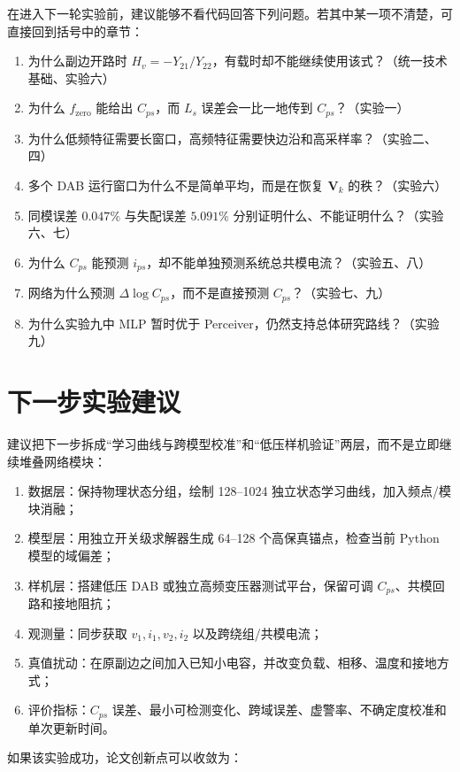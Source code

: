 \documentclass[UTF8,a4paper,12pt]{ctexart}
\begin{document}
在进入下一轮实验前，建议能够不看代码回答下列问题。若其中某一项不清楚，可直接回到括号中的章节：
\begin{enumerate}
  \item 为什么副边开路时 $H_v=-Y_{21}/Y_{22}$，有载时却不能继续使用该式？（统一技术基础、实验六）
  \item 为什么 $f_{\mathrm{zero}}$ 能给出 $C_{ps}$，而 $L_s$ 误差会一比一地传到 $C_{ps}$？（实验一）
  \item 为什么低频特征需要长窗口，高频特征需要快边沿和高采样率？（实验二、四）
  \item 多个 DAB 运行窗口为什么不是简单平均，而是在恢复 $\mathbf V_k$ 的秩？（实验六）
  \item 同模误差 $0.047\%$ 与失配误差 $5.091\%$ 分别证明什么、不能证明什么？（实验六、七）
  \item 为什么 $C_{ps}$ 能预测 $i_{ps}$，却不能单独预测系统总共模电流？（实验五、八）
  \item 网络为什么预测 $\Delta\log C_{ps}$，而不是直接预测 $C_{ps}$？（实验七、九）
  \item 为什么实验九中 MLP 暂时优于 Perceiver，仍然支持总体研究路线？（实验九）
\end{enumerate}

\section{下一步实验建议}

建议把下一步拆成“学习曲线与跨模型校准”和“低压样机验证”两层，而不是立即继续堆叠网络模块：

\begin{enumerate}
  \item 数据层：保持物理状态分组，绘制 128--1024 独立状态学习曲线，加入频点/模块消融；
  \item 模型层：用独立开关级求解器生成 64--128 个高保真锚点，检查当前 Python 模型的域偏差；
  \item 样机层：搭建低压 DAB 或独立高频变压器测试平台，保留可调 $C_{ps}$、共模回路和接地阻抗；
  \item 观测量：同步获取 $v_1,i_1,v_2,i_2$ 以及跨绕组/共模电流；
  \item 真值扰动：在原副边之间加入已知小电容，并改变负载、相移、温度和接地方式；
  \item 评价指标：$C_{ps}$ 误差、最小可检测变化、跨域误差、虚警率、不确定度校准和单次更新时间。
\end{enumerate}

如果该实验成功，论文创新点可以收敛为：
\end{document}
